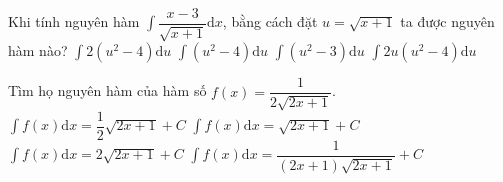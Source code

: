 \begin{ex}
	Khi tính nguyên hàm $\displaystyle\int{\dfrac{x-3}{\sqrt{x+1}}\mathrm{d}x}$, bằng cách đặt $ u=\sqrt{x+1}$ ta được nguyên hàm nào?
	\choice
	{\True $\displaystyle\int{2\left(u^2-4\right)\mathrm{d}u}$}
	{$\displaystyle\int{\left(u^2-4\right)\mathrm{d}u}$}
	{$\displaystyle\int{\left(u^2-3\right)\mathrm{d}u}$}
	{$\displaystyle\int{2u\left(u^2-4\right)\mathrm{d}u}$}
\end{ex}
\begin{ex}
	Tìm họ nguyên hàm của hàm số $ f(x)=\dfrac{1}{2\sqrt{2x+1}}$.
	\choice
	{\True $\displaystyle\int{f(x)}\mathrm{d}x=\dfrac{1}{2}\sqrt{2x+1}+C$}
	{$\displaystyle\int{f(x)}\mathrm{d}x=\sqrt{2x+1}+C$}
	{$\displaystyle\int{f(x)}\mathrm{d}x=2\sqrt{2x+1}+C$}
	{$\displaystyle\int{f(x)}\mathrm{d}x=\dfrac{1}{\left(2x+1\right)\sqrt{2x+1}}+C$}
\end{ex}
